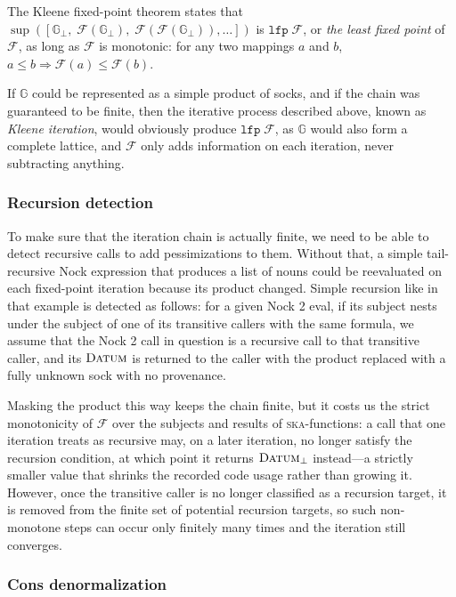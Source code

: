 \documentclass[twoside]{article}
\begin{document}
The Kleene fixed-point theorem \citep{cousot-constructive} states that $\sup\left(\left[\mathbb{G}_\bot,\;\mathcal{F}(\mathbb{G}_\bot),\;\mathcal{F}(\mathcal{F}(\mathbb{G}_\bot)), \ldots{}\right]\right)$ is $\mathtt{lfp}\;\mathcal{F}$, or \emph{the least fixed point} of $\mathcal{F}$, as long as $\mathcal{F}$ is monotonic: for any two mappings $a$ and $b$, $a \leq b \Rightarrow \mathcal{F}(a) \leq \mathcal{F}(b)$.

If $\mathbb{G}$ could be represented as a simple product of socks, and if the chain was guaranteed to be finite, then the iterative process described above, known as \emph{Kleene iteration}, would obviously produce $\mathtt{lfp}\; \mathcal{F}$, as $\mathbb{G}$ would also form a complete lattice, and $\mathcal{F}$ only adds information on each iteration, never subtracting anything.

\subsubsection{Recursion detection}

To make sure that the iteration chain is actually finite, we need to be able to detect recursive calls to add pessimizations to them. Without that, a simple tail-recursive Nock expression that produces a list of nouns could be reevaluated on each fixed-point iteration because its product changed. Simple recursion like in that example is detected as follows: for a given Nock 2 eval, if its subject nests under the subject of one of its transitive callers with the same formula, we assume that the Nock 2 call in question is a recursive call to that transitive caller, and its $\textsc{Datum}$ is returned to the caller with the product replaced with a fully unknown sock with no provenance.

Masking the product this way keeps the chain finite, but it costs us the strict monotonicity of $\mathcal{F}$ over the subjects and results of \textsc{ska}-functions: a call that one iteration treats as recursive may, on a later iteration, no longer satisfy the recursion condition, at which point it returns $\textsc{Datum}_\bot$ instead---a strictly smaller value that shrinks the recorded code usage rather than growing it. However, once the transitive caller is no longer classified as a recursion target, it is removed from the finite set of potential recursion targets, so such non-monotone steps can occur only finitely many times and the iteration still converges.

\subsubsection{Cons denormalization}
\end{document}
